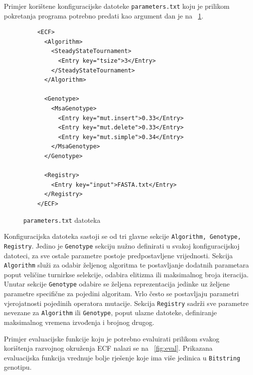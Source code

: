 \documentclass[times, utf8, zavrsni, numeric]{fer}
\begin{document}
 Primjer korištene konfiguracijske datoteke \texttt{parameters.txt} koju je prilikom pokretanja programa  potrebno predati kao argument dan je na ~\ref{fig:param}.
\begin{figure}[!httb]
	
	\begin{verbatim}
	<ECF>
	  <Algorithm>
	    <SteadyStateTournament>
	      <Entry key="tsize">3</Entry>
	    </SteadyStateTournament>
	  </Algorithm>
	
	  <Genotype>
	    <MsaGenotype>
	      <Entry key="mut.insert">0.33</Entry>
	      <Entry key="mut.delete">0.33</Entry>
	      <Entry key="mut.simple">0.34</Entry>
	    </MsaGenotype>
	  </Genotype>
	
	  <Registry>
	    <Entry key="input">FASTA.txt</Entry>
	  </Registry>
	</ECF>
	\end{verbatim}
	\caption{\texttt{parameters.txt} datoteka}
	\label{fig:param}
\end{figure}
 Konfiguracijska datoteka sastoji se od tri glavne sekcije \texttt{Algorithm, Genotype, Registry}. Jedino je \texttt{Genotype} sekciju nužno definirati u svakoj konfiguracijskoj datoteci, za sve ostale parametre postoje predpostavljene vrijednosti. Sekcija \texttt{Algorithm} služi za odabir željenog algoritma te postavljanje dodatnih parametara poput veličine turnirkse selekcije, odabira elitizma ili maksimalnog broja iteracija. Unutar sekcije \texttt{Genotype} odabire se željena reprezentacija jedinke uz željene parametre specifične za pojedini algoritam. Vrlo često se postavljaju parametri vjerojatnosti pojedinih operatora mutacije. Sekcija \texttt{Registry} sadrži sve parametre nevezane za \texttt{Algorithm} ili \texttt{Genotype}, poput ulazne datoteke, definiranje maksimalnog vremena izvođenja i brojnog drugog.
 
 Primjer evaluacijske funkcije koju je potrebno evaluirati prilikom svakog korištenja razvojnog okruženja ECF nalazi se na ~\ref{fig:eval}. Prikazana evaluacijska funkcija vrednuje bolje rješenje koje ima više jedinica u \texttt{Bitstring} genotipu.
 
\end{document}
